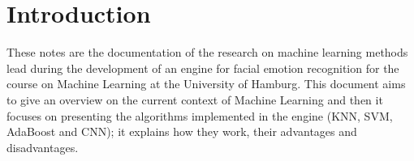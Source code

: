 \section{Introduction}

These notes are the documentation of the research on machine learning methods lead during the development of an engine for facial emotion recognition for the course on Machine Learning at the University of Hamburg. This document aims to give an overview on the current context of Machine Learning and then it focuses on presenting the algorithms implemented in the engine (KNN, SVM, AdaBoost and CNN); it explains how they work, their advantages and disadvantages.